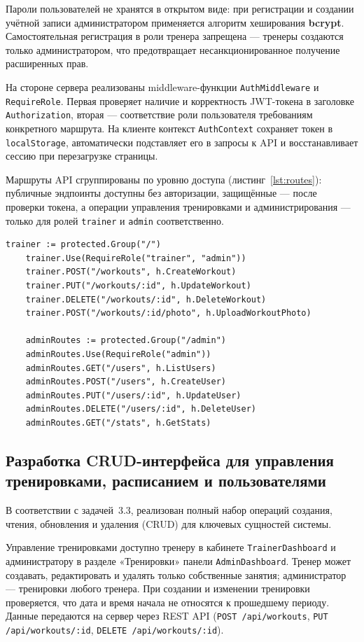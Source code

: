 Пароли пользователей не хранятся в открытом виде: при регистрации и создании
учётной записи администратором применяется алгоритм хеширования
\textbf{bcrypt}. Самостоятельная регистрация в роли тренера запрещена ---
тренеры создаются только администратором, что предотвращает несанкционированное
получение расширенных прав.

На стороне сервера реализованы middleware-функции \texttt{AuthMiddleware} и
\texttt{RequireRole}. Первая проверяет наличие и корректность JWT-токена
в заголовке \texttt{Authorization}, вторая --- соответствие роли пользователя
требованиям конкретного маршрута. На клиенте контекст \texttt{AuthContext}
сохраняет токен в \texttt{localStorage}, автоматически подставляет его в
запросы к API и восстанавливает сессию при перезагрузке страницы.

Маршруты API сгруппированы по уровню доступа (листинг~\ref{lst:routes}):
публичные эндпоинты доступны без авторизации, защищённые --- после проверки
токена, а операции управления тренировками и администрирования --- только
для ролей \texttt{trainer} и \texttt{admin} соответственно.

\begin{lstlisting}[caption={Группировка маршрутов API по ролям (routes.go, стр.~30--43)}, label={lst:routes}]
	trainer := protected.Group("/")
	trainer.Use(RequireRole("trainer", "admin"))
	trainer.POST("/workouts", h.CreateWorkout)
	trainer.PUT("/workouts/:id", h.UpdateWorkout)
	trainer.DELETE("/workouts/:id", h.DeleteWorkout)
	trainer.POST("/workouts/:id/photo", h.UploadWorkoutPhoto)

	adminRoutes := protected.Group("/admin")
	adminRoutes.Use(RequireRole("admin"))
	adminRoutes.GET("/users", h.ListUsers)
	adminRoutes.POST("/users", h.CreateUser)
	adminRoutes.PUT("/users/:id", h.UpdateUser)
	adminRoutes.DELETE("/users/:id", h.DeleteUser)
	adminRoutes.GET("/stats", h.GetStats)
\end{lstlisting}

\subsection{Разработка CRUD-интерфейса для управления тренировками, расписанием и пользователями}

В соответствии с задачей~3.3, реализован полный набор операций создания,
чтения, обновления и удаления (CRUD) для ключевых сущностей системы.

Управление тренировками доступно тренеру в кабинете \texttt{TrainerDashboard}
и администратору в разделе «Тренировки» панели \texttt{AdminDashboard}.
Тренер может создавать, редактировать и удалять только собственные занятия;
администратор --- тренировки любого тренера. При создании и изменении
тренировки проверяется, что дата и время начала не относятся к прошедшему
периоду. Данные передаются на сервер через REST API (\texttt{POST /api/workouts},
\texttt{PUT /api/workouts/:id}, \texttt{DELETE /api/workouts/:id}).

